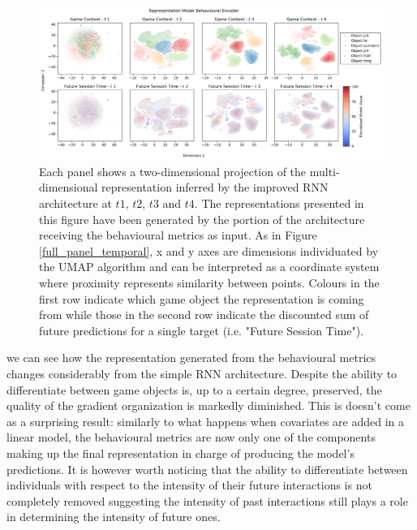 \begin{figure}[ht]
\centering
\includegraphics[width=\textwidth]{images/chapter_4/RNN_env_even_0_lstm_layer_features_Future Session Time.png}
\caption[\textbf{Lower dimensional representation of the latent representations generated by the improved version of the RNN architecture from the behavioural metrics}]{Each panel shows a two-dimensional projection of the multi-dimensional representation inferred by the improved RNN architecture at $t1$, $t2$, $t3$ and $t4$. The representations presented in this figure have been generated by the portion of the architecture receiving the behavioural metrics as input. As in Figure \ref{full_panel_temporal}, x and y axes are dimensions individuated by the UMAP algorithm and can be interpreted as a coordinate system where proximity represents similarity between points. Colours in the first row indicate which game object the representation is coming from while those in the second row indicate the discounted sum of future predictions for a single target (i.e. "Future Session Time").}
\label{rnn_env_even_full_beha}
\end{figure}

we can see how the representation generated from the behavioural metrics changes considerably from the simple RNN architecture. Despite the ability to differentiate between game objects is, up to a certain degree, preserved, the quality of the gradient organization is markedly diminished. This is doesn't come as a surprising result: similarly to what happens when covariates are added in a linear model, the behavioural metrics are now only one of the components making up the final representation in charge of producing the model's predictions. It is however worth noticing that the ability to differentiate between individuals with respect to the intensity of their future interactions is not completely removed suggesting the intensity of past interactions still plays a role in determining the intensity of future ones. 

